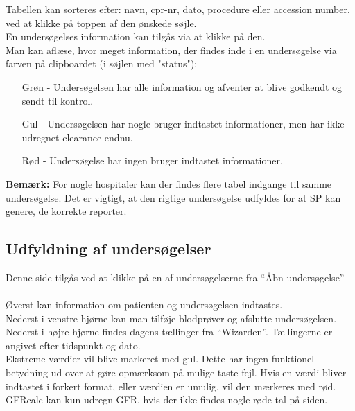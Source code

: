 \documentclass{article}
\begin{document}
Tabellen kan sorteres efter: navn, cpr-nr, dato, procedure eller accession number, ved at klikke på toppen af den ønskede søjle. \\

En undersøgelses information kan tilgås via at klikke på den. \\

Man kan aflæse, hvor meget information, der findes inde i en undersøgelse via farven på clipboardet (i søjlen med "status"):
\begin{itemize}
	\item[Grøn] - Undersøgelsen har alle information og afventer at blive godkendt og sendt til kontrol.
	\item[Gul] - Undersøgelsen har nogle bruger indtastet informationer, men har ikke udregnet clearance endnu. 
	\item[Rød] - Undersøgelse har ingen bruger indtastet informationer. 
\end{itemize} 
\textbf{Bemærk:} For nogle hospitaler kan der findes flere tabel indgange til samme undersøgelse. Det er vigtigt, at den rigtige undersøgelse udfyldes for at  SP kan genere, de korrekte reporter.

\subsection{Udfyldning af undersøgelser}\label{fill_study}
Denne side tilgås ved at klikke på en af undersøgelserne fra “Åbn undersøgelse”\\\\
Øverst kan information om patienten og undersøgelsen indtastes. \\
Nederst i venstre hjørne kan man tilføje blodprøver og afslutte undersøgelsen. \\ 
Nederst i højre hjørne findes dagens tællinger fra “Wizarden”. Tællingerne er angivet efter tidspunkt og dato.  \\

Ekstreme værdier vil blive markeret med gul. Dette har ingen funktionel betydning ud over at gøre opmærksom på mulige taste fejl. Hvis en værdi  bliver indtastet i forkert format, eller værdien er umulig, vil den mærkeres med rød. GFRcalc kan kun udregn GFR, hvis der ikke findes nogle røde tal på siden. \\
\end{document}
